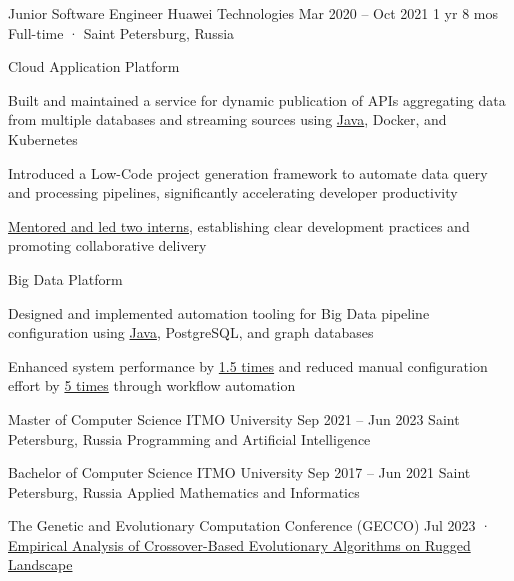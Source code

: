 \documentclass[11pt, a4paper]{style}
\begin{document}
\begin{paracol}{2}
    \cvEntry
        {Junior Software Engineer} {Huawei Technologies}
        {Mar 2020 -- Oct 2021} {1 yr 8 mos}
        {Full-time · Saint Petersburg, Russia}
        {
            Cloud Application Platform \\
            \vspace{-5mm}
            \begin{cvItems}
                \item Built and maintained a service for dynamic publication of APIs aggregating data from multiple databases and streaming sources using \underline{Java}, Docker, and Kubernetes
                \item Introduced a Low-Code project generation framework to automate data query and processing pipelines, significantly accelerating developer productivity
                \item \underline{Mentored and led two interns}, establishing clear development practices and promoting collaborative delivery
            \end{cvItems}
            \vspace{-1mm}
            Big Data Platform \\
            \vspace{-5mm}
            \begin{cvItems}
                \item Designed and implemented automation tooling for Big Data pipeline configuration using \underline{Java}, PostgreSQL, and graph databases
                \item Enhanced system performance by \underline{1.5 times} and reduced manual configuration effort by \underline{5 times} through workflow automation
            \end{cvItems}
        }


    \cvEntry
        {Master of Computer Science} {ITMO University}
        {Sep 2021 -- Jun 2023} {}
        {Saint Petersburg, Russia}
        {
            \vspace{-1mm}
            Programming and Artificial Intelligence
        }

    \cvEntry
        {Bachelor of Computer Science} {ITMO University}
        {Sep 2017 -- Jun 2021} {}
        {Saint Petersburg, Russia}
        {
            \vspace{-1mm}
            Applied Mathematics and Informatics
        }

    \cvEntry
        {The Genetic and Evolutionary Computation Conference (GECCO)} {} {} {} {}
        {
            \vspace{1.5mm}
            Jul 2023 · \href{https://dl.acm.org/doi/10.1145/3583133.3596328}{Empirical Analysis of Crossover-Based Evolutionary Algorithms on Rugged Landscape}
        }


\end{paracol}
\end{document}
